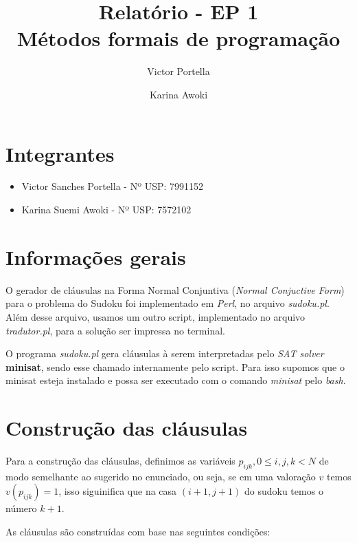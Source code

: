 \documentclass[11pt]{article}
\title{Relatório - EP 1 \\ Métodos formais de programação}
\author{Victor Portella \and Karina Awoki}
\begin{document}
\maketitle

\section{Integrantes}

\begin{itemize}

\item Victor Sanches Portella - Nº USP: 7991152

\item Karina Suemi Awoki - Nº USP: 7572102

\end{itemize}


\section{Informações gerais}

O gerador de cláusulas na Forma Normal Conjuntiva (\emph{Normal Conjuctive Form}) para o problema do Sudoku foi implementado em \emph{Perl}, no arquivo 
\emph{sudoku.pl}. Além desse arquivo, usamos um outro script, implementado no arquivo \emph{tradutor.pl}, para a solução ser impressa no terminal.

O programa \emph{sudoku.pl} gera cláusulas à serem interpretadas pelo \emph{SAT solver} \textbf{\color{red}minisat}, sendo esse chamado internamente pelo script. Para isso supomos que o minisat esteja instalado e possa ser executado com o comando \emph{minisat} pelo \emph{bash}.


\section{Construção das cláusulas}

Para a construção das cláusulas, definimos as variáveis $p_{ijk}, 0\leq i,j,k<N$ 
de modo semelhante ao sugerido no enunciado, ou seja, se em uma valoração $v$ temos $v(p_{ijk}) = 1$, isso siguinifica que na casa $(i+1,j+1)$ do sudoku temos o número $k+1$.

As cláusulas são construídas com base nas seguintes condições:
\end{document}
